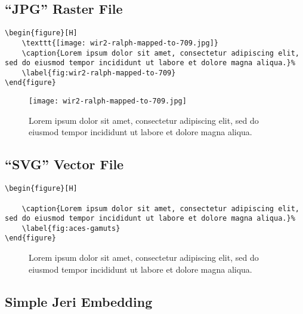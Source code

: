 \subsection*{``JPG'' Raster File}%
\label{subsec:jpg-raster-file}

\begin{lstlisting}[caption={Embedding a ``JPG'' raster file.}]
\begin{figure}[H]
    \texttt{[image: wir2-ralph-mapped-to-709.jpg]}
    \caption{Lorem ipsum dolor sit amet, consectetur adipiscing elit, sed do eiusmod tempor incididunt ut labore et dolore magna aliqua.}%
    \label{fig:wir2-ralph-mapped-to-709}
\end{figure}
\end{lstlisting}

\begin{figure}[H]
    \texttt{[image: wir2-ralph-mapped-to-709.jpg]}
    \caption{Lorem ipsum dolor sit amet, consectetur adipiscing elit, sed do eiusmod tempor incididunt ut labore et dolore magna aliqua.}%
    \label{fig:wir2-ralph-mapped-to-709}
\end{figure}

\subsection*{``SVG'' Vector File}%
\label{subsec:svg-vector-file}

\begin{lstlisting}[caption={Embedding a ``SVG'' vector file.}]
\begin{figure}[H]
    
    \caption{Lorem ipsum dolor sit amet, consectetur adipiscing elit, sed do eiusmod tempor incididunt ut labore et dolore magna aliqua.}%
    \label{fig:aces-gamuts}
\end{figure}
\end{lstlisting}

\begin{figure}[H]
    
    \caption{Lorem ipsum dolor sit amet, consectetur adipiscing elit, sed do eiusmod tempor incididunt ut labore et dolore magna aliqua.}%
    \label{fig:aces-gamuts}
\end{figure}

\subsection*{Simple Jeri Embedding}%

